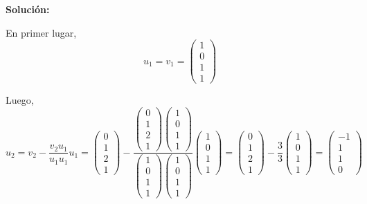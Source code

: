 \documentclass[12pt]{article}
\newenvironment{solucion}
{\begin{mdframed}[backgroundcolor=black!10]
		{\bf Solución:}\\
	}
	{
	\end{mdframed}
}
\newenvironment{preguntas}
{\begin{enumerate}\itemsep12pt
	}
	{
	\end{enumerate}
}
\begin{document}
\begin{preguntas}
\begin{solucion}
\begin{enumerate}[a)]
			En primer lugar,
			$$u_1 = v_1 = \begin{pmatrix}
			1 \\ 0 \\ 1 \\ 1
			\end{pmatrix}$$
			
			Luego,
			$$u_2 = v_2 - \dfrac{v_2u_1}{u_1u_1}u_1
			= \begin{pmatrix}
			0 \\ 1 \\ 2 \\ 1
			\end{pmatrix} - \dfrac{\begin{pmatrix}
				0 \\ 1 \\ 2 \\ 1
				\end{pmatrix}\begin{pmatrix}
				1 \\ 0 \\ 1 \\ 1
				\end{pmatrix}}{\begin{pmatrix}
				1 \\ 0 \\ 1 \\ 1
				\end{pmatrix}\begin{pmatrix}
				1 \\ 0 \\ 1 \\ 1
				\end{pmatrix}}\begin{pmatrix}
			1 \\ 0 \\ 1 \\ 1
			\end{pmatrix} 
			= \begin{pmatrix}
			0 \\ 1 \\ 2 \\ 1
			\end{pmatrix} - \dfrac{3}{3}\begin{pmatrix}
			1 \\ 0 \\ 1 \\ 1
			\end{pmatrix} 
			= \begin{pmatrix}
			-1 \\ 1 \\ 1 \\ 0

\end{pmatrix}$$
\end{enumerate}
\end{solucion}
\end{preguntas}
\end{document}
